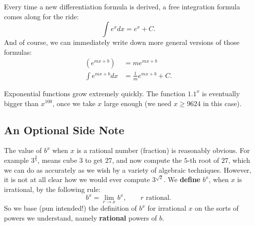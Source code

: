 Every time a new differentiation formula is derived, a free integration formula comes along for the 
ride:
\[\int e^{x} dx=e^x+C.\]
And of course, we can immediately write down more general versions of those formulas:
\begin{align}
\left(e^{mx+b}\right)&=m e^{mx+b}\\
\int e^{mx+b}dx&=\frac1m e^{mx+b}+C.
\end{align}

Exponential functions grow extremely quickly.
The function $1.1^x$ is eventually bigger than $x^{100}$, once we take $x$
large enough (we need $x\ge9624$ in this case).

\subsection*{An Optional Side Note}

The value of $b^x$ when $x$ is a rational number (fraction) is
reasonably obvious. For example $3^{\frac35}$, means cube $3$ to get
$27$, and now compute the $5$-th root of $27$, which we can do as
accurately as we wish by a variety of algebraic techniques. However, it
is not at all clear how we would ever compute $3^{\sqrt2}$. We
\textbf{define} $b^x$, when $x$ is irrational, by the following rule:
\[b^x=\lim_{r\to x}b^x,\qquad r\text{ rational.}\]
So we base (pun intended!) the definition of $b^x$ for irrational $x$ on the sorts
of powers we understand, namely \textbf{rational} powers of $b$.
